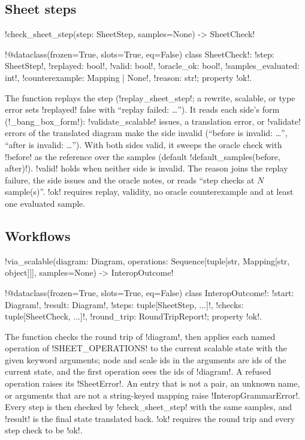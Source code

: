 \subsection{Sheet steps}

\begin{signature}
\py!check_sheet_step(step: SheetStep, samples=None) -> SheetCheck!

\py!@dataclass(frozen=True, slots=True, eq=False) class SheetCheck!: \py!step: SheetStep!, \py!replayed: bool!, \py!valid: bool!, \py!oracle_ok: bool!, \py!samples_evaluated: int!, \py!counterexample: Mapping | None!, \py!reason: str!; property \py!ok!.
\end{signature}

\noindent The function replays the step (\py!replay_sheet_step!; a rewrite, scalable, \bbox{} or type error sets \py!replayed! false with ``replay failed: \ldots''). It reads each side's \bbox{} form (\py!_bang_box_form!): \py!validate_scalable! issues, a translation error, or \py!validate! errors of the translated diagram make the side invalid (``before is invalid: \ldots'', ``after is invalid: \ldots''). With both sides valid, it sweeps the oracle check with \code!before! as the reference over the samples (default \py!default_samples(before, after)!). \py!valid! holds when neither side is invalid. The reason joins the replay failure, the side issues and the oracle notes, or reads ``step checks at $N$ sample(s)''. \py!ok! requires replay, validity, no oracle counterexample and at least one evaluated sample.

\subsection{Workflows}

\begin{signature}
\py!via_scalable(diagram: Diagram, operations: Sequence[tuple[str, Mapping[str, object]]], samples=None) -> InteropOutcome!

\py!@dataclass(frozen=True, slots=True, eq=False) class InteropOutcome!: \py!start: Diagram!, \py!result: Diagram!, \py!steps: tuple[SheetStep, ...]!, \py!checks: tuple[SheetCheck, ...]!, \py!round_trip: RoundTripReport!; property \py!ok!.
\end{signature}

\noindent The function checks the round trip of \py!diagram!, then applies each named operation of \py!SHEET_OPERATIONS! to the current scalable state with the given keyword arguments; node and scale ids in the arguments are ids of the current state, and the first operation sees the ids of \py!diagram!. A refused operation raises its \py!SheetError!. An entry that is not a pair, an unknown name, or arguments that are not a string-keyed mapping raise \py!InteropGrammarError!. Every step is then checked by \py!check_sheet_step! with the same samples, and \py!result! is the final state translated back. \py!ok! requires the round trip and every step check to be \py!ok!.


